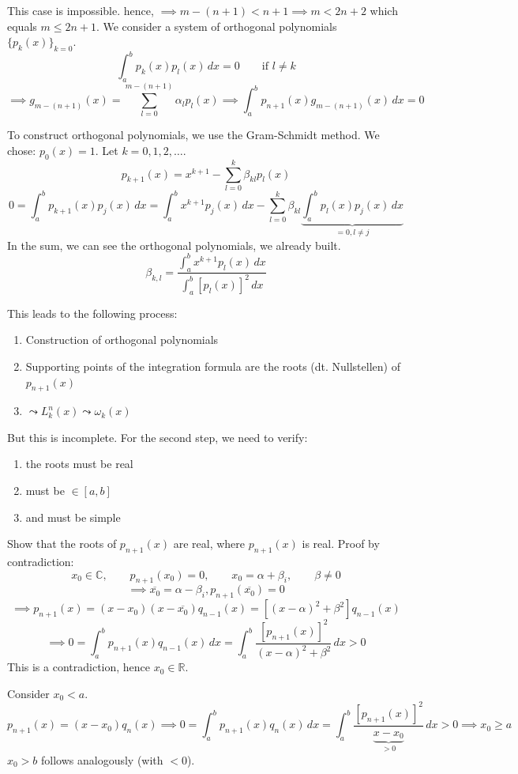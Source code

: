 \documentclass{article}
\begin{document}
This case is impossible. hence, $\implies m - (n+1) < n+1 \implies m < 2n + 2$ which equals $m \leq 2n + 1$.
We consider a system of orthogonal polynomials $\{p_k(x)\}_{k=0}$.
\[ \int_a^b p_k(x) p_l(x) \, dx = 0 \qquad \text{if } l \neq k \]
\[ \implies g_{m-(n+1)}(x) = \sum_{l=0}^{m-(n+1)} \alpha_l p_l(x) \implies \int_a^b p_{n+1}(x) g_{m - (n+1)}(x) \, dx = 0 \]

To construct orthogonal polynomials, we use the Gram-Schmidt method.
We chose: $p_0(x) = 1$.
Let $k = 0,1,2,\ldots$.
\[ p_{k+1}(x) = x^{k+1} - \sum_{l=0}^k \beta_{kl} p_l(x) \]
\[ 0 = \int_a^b p_{k+1}(x) p_j(x) \, dx = \int_a^b x^{k+1} p_j(x) \, dx - \sum_{l=0}^k \beta_{kl} \underbrace{\int_a^b p_l(x) p_j(x) \, dx}_{= 0, l \neq j} \]
In the sum, we can see the orthogonal polynomials, we already built.
\[ \beta_{k,l} = \frac{\int_a^b x^{k+1} p_l(x) \, dx}{\int_a^b [p_l(x)]^2 \, dx} \]

This leads to the following process:
\begin{enumerate}
  \item Construction of orthogonal polynomials
  \item Supporting points of the integration formula are the roots (dt. Nullstellen) of $p_{n+1}(x)$
  \item $\leadsto L_k^n(x) \leadsto \omega_k(x)$
\end{enumerate}

But this is incomplete. For the second step, we need to verify:
\begin{enumerate}
  \item the roots must be real
  \item must be $\in [a,b]$
  \item and must be simple
\end{enumerate}
Show that the roots of $p_{n+1}(x)$ are real, where $p_{n+1}(x)$ is real.  %
Proof by contradiction:
\[ x_0 \in \mathbb C, \qquad p_{n+1}(x_0) = 0, \qquad x_0 = \alpha + \beta_i, \qquad \beta \neq 0 \]
\[ \implies \overline{x_0} = \alpha - \beta_i, p_{n+1}(\overline{x_0}) = 0 \]
\[ \implies p_{n+1}(x) = (x - x_0)(x - \overline{x_0}) q_{n-1}(x) = \left[(x - \alpha)^2 + \beta^2\right] q_{n-1}(x) \]
\[ \implies 0 = \int_a^b p_{n+1}(x) q_{n-1}(x) \, dx = \int_a^b \frac{\left[p_{n+1}(x)\right]^2}{(x - \alpha)^2 + \beta^2} \, dx > 0 \]
This is a contradiction, hence $x_0 \in \mathbb R$.

Consider $x_0 < a$.
\[ p_{n+1}(x) = (x - x_0) q_n(x) \implies 0 = \int_a^b p_{n+1}(x) q_n(x) \, dx = \int_a^b \frac{[p_{n+1}(x)]^2}{\underbrace{x - x_0}_{>0}} \, dx > 0 \implies x_0 \geq a \]
$x_0 > b$ follows analogously (with $<0$).
\end{document}

